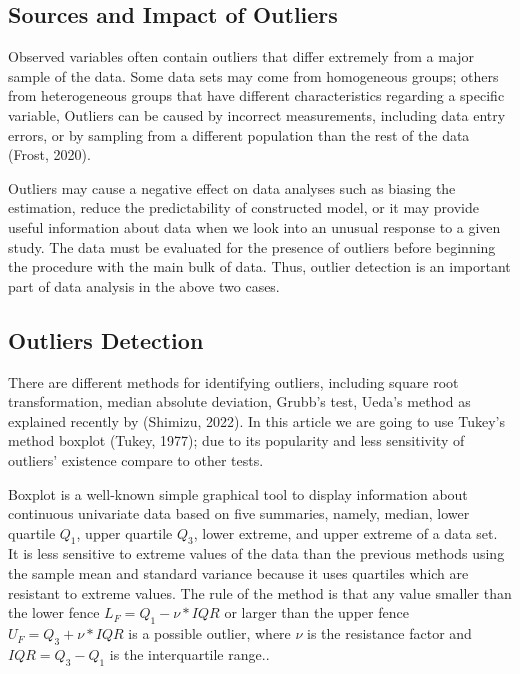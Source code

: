 \documentclass[
]{article}
\begin{document}
\hypertarget{sources-and-impact-of-outliers}{%
\subsection{Sources and Impact of
Outliers}\label{sources-and-impact-of-outliers}}

Observed variables often contain outliers that differ extremely from a
major sample of the data. Some data sets may come from homogeneous
groups; others from heterogeneous groups that have different
characteristics regarding a specific variable, Outliers can be caused by
incorrect measurements, including data entry errors, or by sampling from
a different population than the rest of the data (Frost, 2020).

Outliers may cause a negative effect on data analyses such as biasing
the estimation, reduce the predictability of constructed model, or it
may provide useful information about data when we look into an unusual
response to a given study. The data must be evaluated for the presence
of outliers before beginning the procedure with the main bulk of data.
Thus, outlier detection is an important part of data analysis in the
above two cases.

\hypertarget{outliers-detection}{%
\subsection{Outliers Detection}\label{outliers-detection}}

There are different methods for identifying outliers, including square
root transformation, median absolute deviation, Grubb's test, Ueda's
method as explained recently by (Shimizu, 2022). In this article we are
going to use Tukey's method boxplot (Tukey, 1977); due to its popularity
and less sensitivity of outliers' existence compare to other tests.

Boxplot is a well-known simple graphical tool to display information
about continuous univariate data based on five summaries, namely,
median, lower quartile \(Q_1\), upper quartile \(Q_3\), lower extreme,
and upper extreme of a data set. It is less sensitive to extreme values
of the data than the previous methods using the sample mean and standard
variance because it uses quartiles which are resistant to extreme
values. The rule of the method is that any value smaller than the lower
fence \(L_F=Q_1 - \nu*IQR\) or larger than the upper fence
\(U_F=Q_3+ \nu*IQR\) is a possible outlier, where \(\nu\) is the
resistance factor and \(IQR=Q_3 -Q_1\) is the interquartile range..
\end{document}
